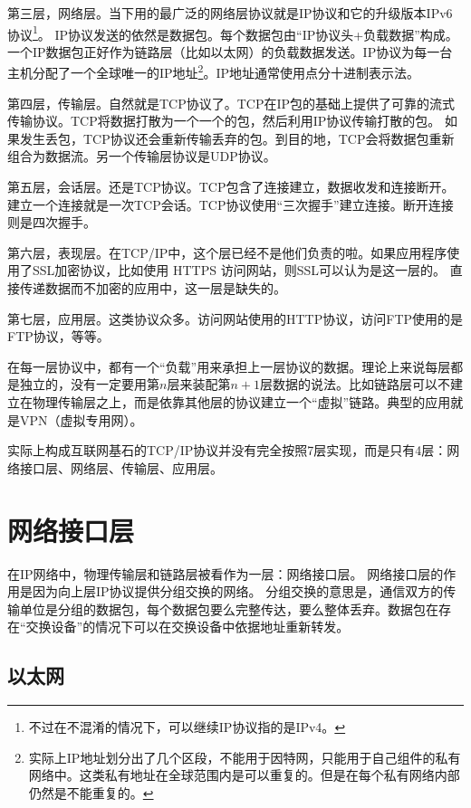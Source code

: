 第三层，网络层。当下用的最广泛的网络层协议就是IP协议和它的升级版本IPv6协议\footnote{不过在不混淆的情况下，可以继续IP协议指的是IPv4。}。
IP协议发送的依然是数据包。每个数据包由“IP协议头+负载数据”构成。一个IP数据包正好作为链路层（比如以太网）的负载数据发送。IP协议为每一台主机分配了一个全球唯一的IP地址\footnote{实际上IP地址划分出了几个区段，不能用于因特网，只能用于自己组件的私有网络中。这类私有地址在全球范围内是可以重复的。但是在每个私有网络内部仍然是不能重复的。}。IP地址通常使用点分十进制表示法。

第四层，传输层。自然就是TCP协议了。TCP在IP包的基础上提供了可靠的流式传输协议。TCP将数据打散为一个一个的包，然后利用IP协议传输打散的包。
如果发生丢包，TCP协议还会重新传输丢弃的包。到目的地，TCP会将数据包重新组合为数据流。另一个传输层协议是UDP协议。 %

第五层，会话层。还是TCP协议。TCP包含了连接建立，数据收发和连接断开。建立一个连接就是一次TCP会话。TCP协议使用“三次握手”建立连接。断开连接则是四次握手。

第六层，表现层。在TCP/IP中，这个层已经不是他们负责的啦。如果应用程序使用了SSL加密协议，比如使用 HTTPS 访问网站，则SSL可以认为是这一层的。
直接传递数据而不加密的应用中，这一层是缺失的。

第七层，应用层。这类协议众多。访问网站使用的HTTP协议，访问FTP使用的是FTP协议，等等。

在每一层协议中，都有一个“负载”用来承担上一层协议的数据。理论上来说每层都是独立的，没有一定要用第$n$层来装配第$n+1$层数据的说法。比如链路层可以不建立在物理传输层之上，而是依靠其他层的协议建立一个“虚拟”链路。典型的应用就是VPN（虚拟专用网）。


实际上构成互联网基石的TCP/IP协议并没有完全按照7层实现，而是只有4层：网络接口层、网络层、传输层、应用层。

\section{网络接口层}

在IP网络中，物理传输层和链路层被看作为一层：网络接口层。
网络接口层的作用是因为向上层IP协议提供分组交换的网络。
分组交换的意思是，通信双方的传输单位是分组的数据包，每个数据包要么完整传达，要么整体丢弃。数据包在存在“交换设备”的情况下可以在交换设备中依据地址重新转发。

\subsection{以太网}

